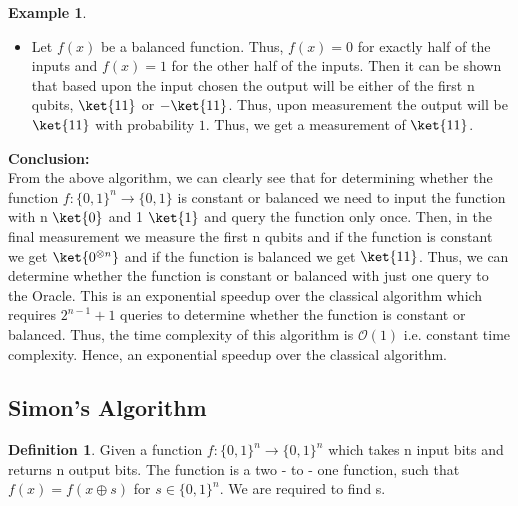 \documentclass[12pt, oneside]{book}
\theoremstyle{definition}
\newtheorem{definition}{Definition}[section]
\theoremstyle{definition}
\newtheorem{example}{Example}[section]
\theoremstyle{remark}
\begin{document}
\begin{example}
\begin{enumerate}
        \begin{itemize}
            \item Let $f(x)$ be a balanced function. Thus, $f(x)=0$ for exactly half of the inputs and $f(x)=1$ for the other half of the inputs.
            Then it can be shown that based upon the input chosen the output will be either of the first n qubits, $\ket{11}$ or $-\ket{11}$.
            Thus, upon measurement the output will be $\ket{11}$ with probability $1$. Thus, we get a measurement of $\ket{11}$.
        \end{itemize}
    \end{enumerate}
\end{example}
\textbf{Conclusion: }\\
From the above algorithm, we can clearly see that for determining whether the 
function $f:\{0,1\}^n \rightarrow \{0,1\}$ is constant or balanced we need to input the function with n $\ket{0}$ and 1 $\ket{1}$ and query the function only once.
Then, in the final measurement we measure the first n qubits and if the function is constant we get $\ket{0^{\otimes n}}$ and if the function is balanced we get $\ket{11}$.
Thus, we can determine whether the function is constant or balanced with just one query to the Oracle. This is an exponential speedup over the classical algorithm which requires $2^{n-1}+1$ queries to determine whether the function is constant or balanced.
Thus, the time complexity of this algorithm is $\mathcal{O}(1)$ i.e. constant time complexity. Hence, an exponential speedup over the classical algorithm.

\subsection{Simon's Algorithm}
\begin{definition}
    Given a function $f:\{0,1\}^n \rightarrow \{0,1\}^n$ which takes n input bits and returns n output bits.
    The function is a two - to - one function, such that $f(x)=f(x\oplus s)$ for $s \in \{0,1\}^n$.
    We are required to find s.
\end{definition}
\end{document}
